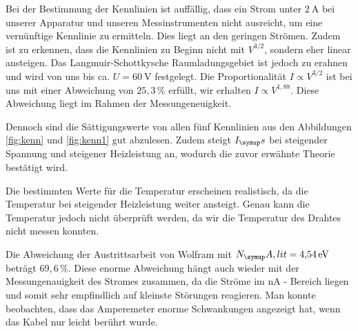 Bei der Bestimmung der Kennlinien ist auffällig, dass ein Strom unter $\SI{2}{\ampere}$
bei unserer Apparatur und unseren Messinstrumenten nicht ausreicht, um eine vernünftige
Kennlinie zu ermitteln. Dies liegt an den geringen Strömen. Zudem ist zu erkennen, dass
die Kennlinien zu Beginn nicht mit $V^{3/2}$, sondern eher linear ansteigen. Das Langmuir-Schottkysche
Raumladungsgebiet ist jedoch zu erahnen und wird von uns bis ca. $U = \SI{60}{\volt}$
festgelegt. Die Proportionalität $I \propto V^{3/2}$ ist bei uns mit einer
Abweichung von $25,3\,\%$ erfüllt,
wir erhalten $I \propto V^{1,88}$. Diese Abweichung liegt im Rahmen der Messungeneuigkeit.

Dennoch
sind die Sättigungswerte von allen fünf Kennlinien aus den Abbildungen
\ref{fig:kenn} und \ref{fig:kenn1} gut abzulesen. Zudem steigt
$I_\su{s}$ bei steigender Spannung und steigener Heizleistung an, wodurch die
zuvor erwähnte Theorie bestätigt wird.

Die bestimmten Werte für die Temperatur erscheinen realistisch, da die Temperatur bei
steigender Heizleistung weiter ansteigt. Genau kann die Temperatur jedoch nicht überprüft
werden, da wir die Temperatur des Drahtes nicht messen konnten.

Die Abweichung der Austrittsarbeit von Wolfram mit $N_\su{A,lit} = \SI{4,54}{\electronvolt}$
\cite{na} beträgt $69,6\,\%$. Diese enorme Abweichung hängt auch wieder mit der Messungenauigkeit des
Stromes zusammen, da die Ströme im $\si{\nano\ampere}$ - Bereich liegen und somit
sehr empfindlich auf kleinste Störungen reagieren. Man konnte beobachten, dass
das Amperemeter enorme Schwankungen angezeigt hat, wenn das Kabel nur leicht
berührt wurde. 
